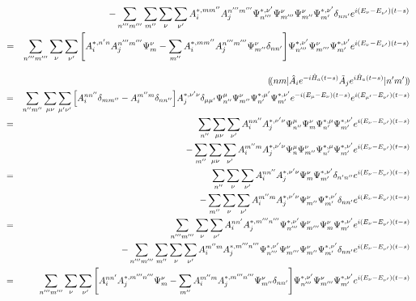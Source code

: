 \documentclass[10.5pt,a4paper]{jreport}
\newcommand{\dpbra}[1]{( \! ( #1 |}
\newcommand{\dpket}[1]{| #1 ) \! )}
\begin{document}
\begin{eqnarray}
  &&- \sum_{n'''m'''}\sum_{ {m''}}\sum_{ {\nu}}\sum_{ {\nu'}}A_i^{*,  {mm''}}A_j^{ {n'''m'''}}\Psi_{n'''}^{ {*, \nu'}}\Psi_{m'''}^{ {\nu}}\Psi_{m''}^{\nu}\Psi_{m'}^{*, \nu'}\delta_{ {nn'}}e^{ {i(E_\nu- E_{\nu'})(t-s)}}\\
  \nonumber &=&\sum_{n'''m'''}\sum_{\nu}\sum_{\nu'}\bqty{A_i^{*, n'n}A_j^{n'''m'''}\Psi_{m}^{\nu} - \sum_{m''}A_i^{*, mm''}A_j^{n'''m'''}\Psi_{m''}^{\nu}\delta_{nn'}}\Psi_{n'''}^{*, \nu'}\Psi_{m'''}^{\nu}\Psi_{m'}^{*, \nu'}e^{i(E_\nu- E_{\nu'})(t-s)}\\
\end{eqnarray}

\begin{eqnarray}
\nonumber  &&\dpbra{nm}\hat{A}_ie^{-i\hat{H}_a(t-s)}\tilde{A}_j e^{i\hat{H}_a(t-s)}\dpket{n'm'}\\
  \nonumber &=& \sum_{n''m''}\sum_{\mu\nu}\sum_{\mu'\nu'}\bqty{A_i^{ {nn''}}\delta_{mm''} - A_i^{ {m''m}}\delta_{nn''}}A_j^{ {*, \nu'\nu}}\delta_{ {\mu\mu'}}\Psi_{n''}^{\mu}\Psi_{m''}^{\nu}\Psi_{n'}^{*, \mu'}\Psi_{m'}^{*, \nu'}e^{-i(E_\mu - E_\nu)(t-s)}e^{i(E_{\mu'} - E_{\nu'})(t-s)}\\
  \nonumber &=&\sum_{n''}\sum_{\mu\nu}\sum_{ {\nu'}}A_i^{nn''}A_j^{*, \nu'\nu}\Psi_{n''}^{\mu}\Psi_{m}^{\nu}\Psi_{n'}^{*, \mu}\Psi_{m'}^{*, \nu'}e^{ {i(E_\nu- E_{\nu'})(t-s)}}\\
  &&- \sum_{m''}\sum_{\mu\nu}\sum_{ {\nu'}}A_i^{m''m}A_j^{ {*, \nu'\nu}}\Psi_{n}^{\mu}\Psi_{m''}^{\nu}\Psi_{n'}^{*, \mu}\Psi_{m'}^{*, \nu'}e^{ {i(E_\nu- E_{\nu'})(t-s)}}\\
  \nonumber &=&\sum_{n''}\sum_{ {\nu}}\sum_{ {\nu'}}A_i^{ {nn''}}A_j^{*, \nu'\nu}\Psi_{m}^{\nu}\Psi_{m'}^{*, \nu'}\delta_{ {n'n''}}e^{ {i(E_\nu- E_{\nu'})(t-s)}}\\
  &&- \sum_{m''}\sum_{ {\nu}}\sum_{ {\nu'}}A_i^{m''m}A_j^{*, \nu'\nu}\Psi_{m''}^{\nu}\Psi_{m'}^{*, \nu'}\delta_{ {nn'}}e^{ {i(E_\nu- E_{\nu'})(t-s)}}\\
  \nonumber &=&\sum_{n'''m'''}\sum_{ {\nu}}\sum_{ {\nu'}}A_i^{nn'}A_j^{*, m'''n'''}\Psi_{n'''}^{ {*, \nu'}}\Psi_{m'''}^{ {\nu}}\Psi_{m}^{ {\nu}}\Psi_{m'}^{*, \nu'}e^{ {i(E_\nu- E_{\nu'})(t-s)}}\\
  &&- \sum_{n'''m'''}\sum_{ {m''}}\sum_{ {\nu}}\sum_{ {\nu'}}A_i^{m''m}A_j^{*, m'''n'''}\Psi_{n'''}^{ {*, \nu'}}\Psi_{m'''}^{ {\nu}}\Psi_{m''}^{\nu}\Psi_{m'}^{*, \nu'}\delta_{ {nn'}}e^{ {i(E_\nu- E_{\nu'})(t-s)}}\\
  \nonumber &=&\sum_{n'''m'''}\sum_{\nu}\sum_{\nu'}\bqty{A_i^{nn'}A_j^{*, m'''n'''}\Psi_{m}^{\nu}- \sum_{m''}A_i^{m''m}A_j^{*, m'''n'''}\Psi_{m''}^{\nu}\delta_{nn'} }\Psi_{n'''}^{*, \nu'}\Psi_{m'''}^{\nu}\Psi_{m'}^{*, \nu'}e^{i(E_\nu- E_{\nu'})(t-s)}\\
\end{eqnarray}
\end{document}
